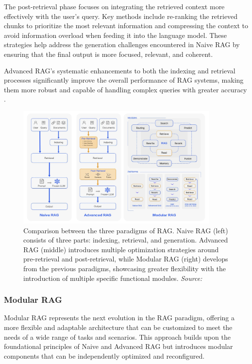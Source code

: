 The post-retrieval phase focuses on integrating the retrieved context more effectively with the user’s query. Key methods include re-ranking the retrieved chunks to prioritize the most relevant information and compressing the context to avoid information overload when feeding it into the language model. These strategies help address the generation challenges encountered in Naive RAG by ensuring that the final output is more focused, relevant, and coherent.

Advanced RAG’s systematic enhancements to both the indexing and retrieval processes significantly improve the overall performance of RAG systems, making them more robust and capable of handling complex queries with greater accuracy \cite{gao2023retrieval}.

\begin{figure}[h]
    \centering
    \includegraphics[width=0.9\textwidth]{images/llms/naive-adv-modular-rag.png}
    \caption{Comparison between the three paradigms of RAG. Naive RAG (left) consists of three parts: indexing, retrieval, and generation. Advanced RAG (middle) introduces multiple optimization strategies around pre-retrieval and post-retrieval, while Modular RAG (right) develops from the previous paradigms, showcasing greater flexibility with the introduction of multiple specific functional modules. \textit{Source:} \cite{gao2023retrieval}}
    \label{fig:rag_paradigms}
\end{figure}

\subsubsection{Modular RAG}

Modular RAG represents the next evolution in the RAG paradigm, offering a more flexible and adaptable architecture that can be customized to meet the needs of a wide range of tasks and scenarios. This approach builds upon the foundational principles of Naive and Advanced RAG but introduces modular components that can be independently optimized and reconfigured.

